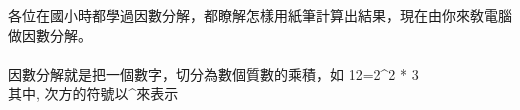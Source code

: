 各位在國小時都學過因數分解，都瞭解怎樣用紙筆計算出結果，現在由你來敎電腦做因數分解。\\
\\
因數分解就是把一個數字，切分為數個質數的乘積，如 12=2\textasciicircum2 * 3\\
其中, 次方的符號以\textasciicircum 來表示\\